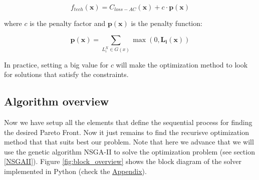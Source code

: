 \documentclass[a4paper,11pt, titlepage, twoside]{article}
\begin{document}
\begin{equation}
    f_{tech}(\mathbf{x}) = C_{loss-AC}(\mathbf{x}) + c \cdot \mathbf{p(x)}
\end{equation}

where $c$ is the penalty factor and $\mathbf{p(x)}$ is the penalty function:

\begin{equation}
    \mathbf{p(x)} = \sum_{L_i^X \in G(x)} \max(0, \mathbf{L_i(x)})
\end{equation}

In practice, setting a big value for $c$ will make the optimization method to look for solutions that satisfy the constraints.
\subsection{Algorithm overview}

Now we have setup all the elements that define the sequential process for finding the desired Pareto Front. Now it just remains
to find the recurisve optimization method that that suits best our problem. Note that here we advance that we will use the genetic algorithm
NSGA-II to solve the optimization problem (see section \ref{NSGAII}). Figure \ref{fig:block_overview} shows the block diagram of the solver implemented in Python (check the \hyperref[Appendix]{Appendix}).
\end{document}

